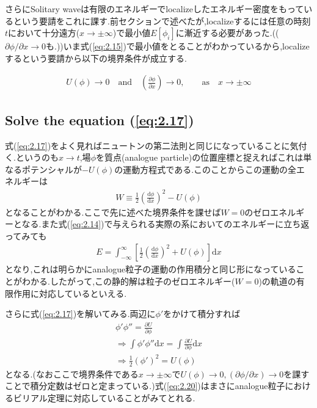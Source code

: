 \documentclass[dvipdfmx,11pt,a4paper,oneside,openany]{jsbook}
\begin{document}
さらにSolitary waveは有限のエネルギーでlocalizeしたエネルギー密度をもっているという要請をこれに課す.前セクションで述べたが,localizeするには任意の時刻$t$において十分遠方($x\rightarrow \pm\infty$)で最小値$E[\phi_i]$に漸近する必要があった.(($\partial\phi/\partial x\rightarrow 0$も.))いま式(\ref{eq:2.15})で最小値をとることがわかっているから,localizeするという要請から以下の境界条件が成立する.
\begin{screen}
    \begin{align*}
        U(\phi)\rightarrow0 \quad \text{and} \quad \left(\frac{\partial\phi}{\partial x}\right)\rightarrow 0,\qquad \text{as}\quad x\rightarrow \pm \infty
    \end{align*}
\end{screen}

\subsection{Solve the equation (\ref{eq:2.17})}
式(\ref{eq:2.17})をよく見ればニュートンの第二法則と同じになっていることに気付く.というのも$x\rightarrow t$,場$\phi$を質点(analogue particle)の位置座標と捉えればこれは単なるポテンシャルが$-U(\phi)$の運動方程式である.このことからこの運動の全エネルギーは
\begin{align}
    W \equiv \frac{1}{2}\left(\frac{\mathrm{d} \phi}{\mathrm{d}x}\right)^{2}-U(\phi)\label{eq:2.18}
\end{align}
となることがわかる.ここで先に述べた境界条件を課せば$W=0$のゼロエネルギーとなる.また式(\ref{eq:2.14})で与えられる実際の系においてのエネルギーに立ち返ってみても
\begin{align}
    E=\int_{-\infty}^{\infty}\left[\frac{1}{2}\left(\frac{\mathrm{d}\phi}{\mathrm{d}x}\right)^2+U(\phi)\right]\mathrm{d}x
\end{align}
となり,これは明らかにanalogue粒子の運動の作用積分と同じ形になっていることがわかる.したがって,この静的解は粒子のゼロエネルギー($W=0$)の軌道の有限作用に対応しているといえる.

さらに式(\ref{eq:2.17})を解いてみる.両辺に$\phi'$をかけて積分すれば
\begin{align}
    \phi'\phi''=\frac{\partial U}{\partial\phi}\nonumber                                            \\
    \Rightarrow \int\phi'\phi''\mathrm{d}x=\int\frac{\partial U}{\partial \phi}\mathrm{d}x\nonumber \\
    \Rightarrow \frac{1}{2}\left(\phi'\right)^2=U(\phi)\label{eq:2.20}
\end{align}
となる.(なおここで境界条件である$x\rightarrow \pm \infty$で$U(\phi)\rightarrow 0, (\partial \phi/\partial x)\rightarrow 0$を課すことで積分定数はゼロと定まっている.)式(\ref{eq:2.20})はまさにanalogue粒子におけるビリアル定理に対応していることがみてとれる.
\end{document}
